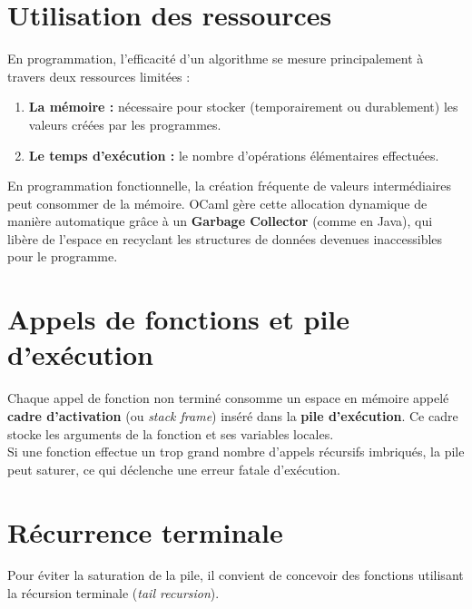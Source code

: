\documentclass{article}
\begin{document}

\section{Utilisation des ressources}

En programmation, l'efficacité d'un algorithme se mesure principalement à travers deux ressources limitées :
\begin{enumerate}
    \item \textbf{La mémoire :} nécessaire pour stocker (temporairement ou durablement) les valeurs créées par les programmes.
    \item \textbf{Le temps d'exécution :} le nombre d'opérations élémentaires effectuées.
\end{enumerate}

En programmation fonctionnelle, la création fréquente de valeurs intermédiaires peut consommer de la mémoire. OCaml gère cette allocation dynamique de manière automatique grâce à un \textbf{Garbage Collector} (comme en Java), qui libère de l'espace en recyclant les structures de données devenues inaccessibles pour le programme.

\section{Appels de fonctions et pile d'exécution}

Chaque appel de fonction non terminé consomme un espace en mémoire appelé \textbf{cadre d'activation} (ou \textit{stack frame}) inséré dans la \textbf{pile d'exécution}. Ce cadre stocke les arguments de la fonction et ses variables locales.\\

\noindent Si une fonction effectue un trop grand nombre d'appels récursifs imbriqués, la pile peut saturer, ce qui déclenche une erreur fatale d'exécution.


\section{Récurrence terminale}

Pour éviter la saturation de la pile, il convient de concevoir des fonctions utilisant la récursion terminale (\textit{tail recursion}).
\end{document}
